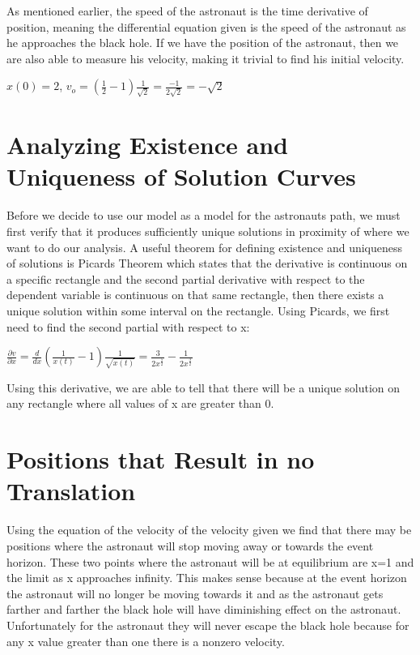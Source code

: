 \documentclass[11pt,english]{article}
\begin{document}
As mentioned earlier, the speed of the astronaut is the time derivative of position, meaning the differential equation given is the speed of the astronaut as he approaches the black hole. If we have the position of the astronaut, then we are also able to measure his velocity, making it trivial to find his initial velocity.

\begin{center}
$x(0) = 2$,  $v_o = (\frac{1}{2} - 1)\frac{1}{\sqrt{2}} = \frac{-1}{2\sqrt{2}} = -\sqrt{2}$
\end{center}

\section*{Analyzing Existence and Uniqueness of Solution Curves}

Before we decide to use our model as a model for the astronaut\textquotesingle s path, we must first verify that it produces sufficiently unique solutions in proximity of where we want to do our analysis. A useful theorem for defining existence and uniqueness of solutions is Picard\textquotesingle s Theorem which states that the derivative is continuous on a specific rectangle and the second partial derivative with respect to the dependent variable is continuous on that same rectangle, then there exists a unique solution within some interval on the rectangle. Using Picard\textquotesingle s, we first need to find the second partial with respect to x:

\begin{center}
  $\frac{\partial v}{\partial x} = \frac{d}{dx} (\frac{1}{x(t)} - 1) \frac{1}{\sqrt{x(t)}} = \frac{3}{2x^\frac{5}{2}} - \frac{1}{2x^\frac{3}{2}}$
\end{center}

Using this derivative, we are able to tell that there will be a unique solution on any rectangle where all values of x are greater than 0. 

\section*{Positions that Result in no Translation}

Using the equation of the velocity of the velocity given we find that there may be positions where the astronaut will stop moving away or towards the event horizon. These two points where the astronaut will be at equilibrium are x=1 and the limit as x approaches infinity. This makes sense because at the event horizon the astronaut will no longer be moving towards it and as the astronaut gets farther and farther the black hole will have diminishing effect on the astronaut. Unfortunately for the astronaut they will never escape the black hole because for any x value greater than one there is a nonzero velocity.
\end{document}
